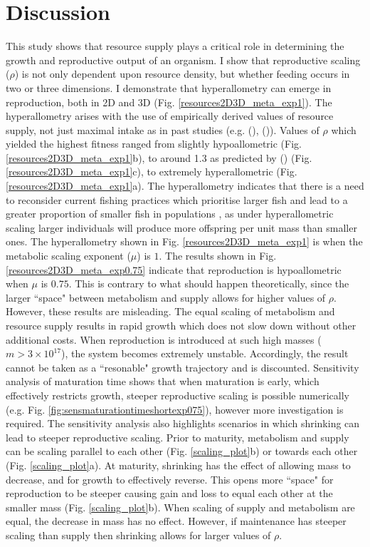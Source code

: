 \documentclass[a4paper, 11pt, hidelinks]{article} %
\newcommand{\authorcite}[1]{\citeauthor{#1} (\citeyear{#1})}
\begin{document}
\section{Discussion}
	This study shows that resource supply plays a critical role in determining the growth and reproductive output of an organism.  I show that reproductive scaling ($ \rho $) is not only dependent upon resource density, but whether feeding occurs in two or three dimensions.  
	I demonstrate that hyperallometry can emerge in reproduction, both in 2D and 3D (Fig. \ref{resources2D3D_meta_exp1}).  The hyperallometry arises with the use of empirically derived values of resource supply, not just maximal intake as in past studies (e.g. \authorcite{West2001}, \authorcite{Hou2008}).  Values of $ \rho $ which yielded the highest fitness ranged from slightly hypoallometric (Fig. \ref{resources2D3D_meta_exp1}b), to around 1.3 as predicted by \citeauthor{Barneche2018} (\citeyear{Barneche2018}) (Fig. \ref{resources2D3D_meta_exp1}c), to extremely hyperallometric (Fig. \ref{resources2D3D_meta_exp1}a).  The hyperallometry indicates that there is a need to reconsider current fishing practices which prioritise larger fish and lead to a greater proportion of smaller fish in populations \parencite{Heino2013}, as under hyperallometric scaling larger individuals will produce more offspring per unit mass than smaller ones.  The hyperallometry shown in Fig. \ref{resources2D3D_meta_exp1} is when the metabolic scaling exponent ($ \mu $) is $ 1 $.
	The results shown in Fig. \ref{resources2D3D_meta_exp0.75} indicate that reproduction is hypoallometric when $ \mu $ is $ 0.75 $.  This is contrary to what should happen theoretically, since the larger ``space" between metabolism and supply allows for higher values of $ \rho $. However, these results are misleading.  The equal scaling of metabolism and resource supply results in rapid growth which does not slow down without other additional costs.  When reproduction is introduced at such high masses ($ m > 3\times 10^{17} $), the system becomes extremely unstable.  Accordingly, the result cannot be taken as a ``resonable" growth trajectory and is discounted.  Sensitivity analysis of maturation time shows that when maturation is early, which effectively restricts growth, steeper reproductive scaling is possible numerically (e.g. Fig. \ref{fig:sensmaturationtimeshortexp075}), however more investigation is required.
	The sensitivity analysis also highlights scenarios in which shrinking can lead to steeper reproductive scaling.  Prior to maturity, metabolism and supply can be scaling parallel to each other (Fig. \ref{scaling_plot}b) or towards each other (Fig. \ref{scaling_plot}a).  At maturity, shrinking has the effect of allowing mass to decrease, and for growth to effectively reverse.  This opens more ``space" for reproduction to be steeper causing gain and loss to equal each other at the smaller mass (Fig. \ref{scaling_plot}b).  When scaling of supply and metabolism are equal, the decrease in mass has no effect. However, if maintenance has steeper scaling than supply then shrinking allows for larger values of $ \rho $.
	
\end{document}
